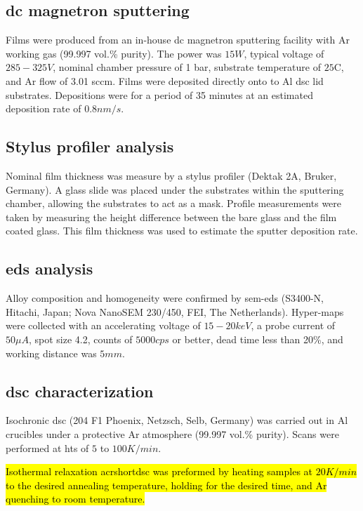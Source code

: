\documentclass[a4paper,12pt,oneside]{article}%
\begin{document}
\subsection{\acrshort{dc} magnetron sputtering}
Films were produced from an in-house \gls{dc} magnetron sputtering facility with Ar working gas (99.997 vol.\% purity). The power was $15W$, typical voltage of $285-325V$, nominal chamber pressure of 1 bar, substrate temperature of $25$\degree C, and Ar flow of 3.01 \acrshort{sccm}. Films were deposited directly onto to Al \acrshort{dsc} lid substrates. Depositions were for a period of 35 minutes at an estimated deposition rate of $0.8 nm/s$. 

\subsection{Stylus profiler analysis}
Nominal film thickness was measure by a stylus profiler (Dektak 2A, Bruker, Germany). A glass slide was placed under the substrates within the sputtering chamber, allowing the substrates to act as a mask. Profile measurements were taken by measuring the height difference between the bare glass and the film coated glass. This film thickness was used to estimate the sputter deposition rate.  

\subsection{\acrshort{eds} analysis}
Alloy composition and homogeneity were confirmed by \acrshort{sem}-\acrshort{eds} (S3400-N, Hitachi, Japan; Nova NanoSEM 230/450, FEI, The Netherlands). Hyper-maps were collected with an accelerating voltage of $15-20keV$, a probe current of $50 \mu A$, spot size 4.2, counts of $5000cps$ or better, dead time less than 20\%, and working distance was $5mm$.

\subsection{\acrshort{dsc} characterization}
Isochronic \acrshort{dsc} (204 F1 Phoenix, Netzsch, Selb, Germany) was carried out in Al crucibles under a protective Ar atmosphere (99.997 vol.\% purity). Scans were performed at \glspl{ht} of $5$ to $100 K/min$. 

\hl{Isothermal relaxation acrshort{dsc} was preformed by heating samples at $20 K/min$ to the desired annealing temperature, holding for the desired time, and Ar quenching to room temperature.}
\end{document}
